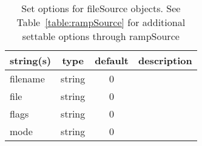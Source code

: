 \begin{table}[ht]
\centering
\begin{tabular}{p{5cm} c c p{7cm}}
\hline
string(s) & type & default & description \\
\hline
filename & string & 0 & \\
file & string & 0 & \\
flags & string & 0 & \\
mode & string & 0 & \\
\hline
\end{tabular}
\caption{Set options for fileSource objects. See Table~\ref{table:rampSource} for additional settable options through rampSource}
\label{table:fileSource}
\end{table}

